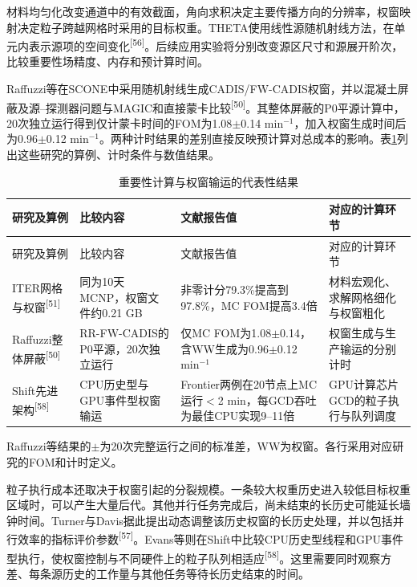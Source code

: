 \documentclass[UTF8, zihao=-4, fontset=none, a4paper]{ctexart}
\newcommand{\upcite}[1]{\textsuperscript{[#1]}}
\begin{document}
材料均匀化改变通道中的有效截面，角向求积决定主要传播方向的分辨率，权窗映射决定粒子跨越网格时采用的目标权重。THETA使用线性源随机射线方法，在单元内表示源项的空间变化\upcite{56}。后续应用实验将分别改变源区尺寸和源展开阶次，比较重要性场精度、内存和预计算时间。

Raffuzzi等在SCONE中采用随机射线生成CADIS/FW-CADIS权窗，并以混凝土屏蔽及源--探测器问题与MAGIC和直接蒙卡比较\upcite{50}。其整体屏蔽的P0平源计算中，20次独立运行得到仅计蒙卡时间的FOM为1.08$\pm$0.14 min$^{-1}$，加入权窗生成时间后为0.96$\pm$0.12 min$^{-1}$。两种计时结果的差别直接反映预计算对总成本的影响。表\ref{tab:4}列出这些研究的算例、计时条件与数值结果。
\begin{longtable}{@{}>{\raggedright\arraybackslash}p{}>{\raggedright\arraybackslash}p{}>{\raggedright\arraybackslash}p{}>{\raggedright\arraybackslash}p{}@{}}
\caption{重要性计算与权窗输运的代表性结果}\label{tab:4}\\
\toprule
研究及算例 & 比较内容 & 文献报告值 & 对应的计算环节 \\
\midrule
\endfirsthead
\toprule
研究及算例 & 比较内容 & 文献报告值 & 对应的计算环节 \\
\midrule
\endhead
\bottomrule
\endlastfoot
ITER网格与权窗\upcite{51} & 同为10天MCNP，权窗文件约0.21 GB & 非零计分79.3\%提高到97.8\%，MC FOM提高3.4倍 & 材料宏观化、求解网格细化与权窗粗化 \\
Raffuzzi整体屏蔽\upcite{50} & RR-FW-CADIS的P0平源，20次独立运行 & 仅MC FOM为1.08$\pm$0.14，含WW生成为0.96$\pm$0.12 min$^{-1}$ & 权窗生成与生产输运的分别计时 \\
Shift先进架构\upcite{58} & CPU历史型与GPU事件型权窗输运 & Frontier两例在20节点上MC运行$<$2 min，每GCD吞吐为最佳CPU实现9--11倍 & GPU计算芯片GCD的粒子执行与队列调度 \\
\end{longtable}

Raffuzzi等结果的$\pm$为20次完整运行之间的标准差，WW为权窗。各行采用对应研究的FOM和计时定义。

粒子执行成本还取决于权窗引起的分裂规模。一条较大权重历史进入较低目标权重区域时，可以产生大量后代。其他并行任务完成后，尚未结束的长历史可能延长墙钟时间。Turner与Davis据此提出动态调整该历史权窗的长历史处理，并以包括并行效率的指标评价参数\upcite{57}。Evans等则在Shift中比较CPU历史型线程和GPU事件型执行，使权窗控制与不同硬件上的粒子队列相适应\upcite{58}。这里需要同时观察方差、每条源历史的工作量与其他任务等待长历史结束的时间。
\end{document}
